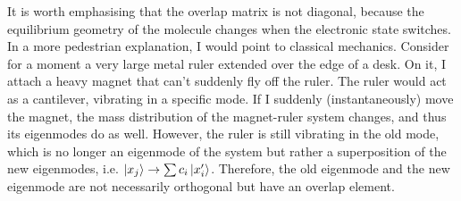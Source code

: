 It is worth emphasising that the overlap matrix is not diagonal, because the equilibrium geometry of the molecule changes when the electronic state switches. In a more pedestrian explanation, I would point to classical mechanics. Consider for a moment a very large metal ruler extended over the edge of a desk. On it, I attach a heavy magnet that can't suddenly fly off the ruler. The ruler would act as a cantilever, vibrating in a specific mode. If I suddenly (instantaneously) move the magnet, the mass distribution of  the magnet-ruler system changes, and thus its eigenmodes do as well. However, the ruler is still vibrating in the old mode, which is no longer an eigenmode of the system but rather a superposition of the new eigenmodes, i.e. $\ket{x_j} \rightarrow \sum c_i \ket{x'_i}$. Therefore, the old eigenmode and the new eigenmode are not necessarily orthogonal but have an overlap element. 

